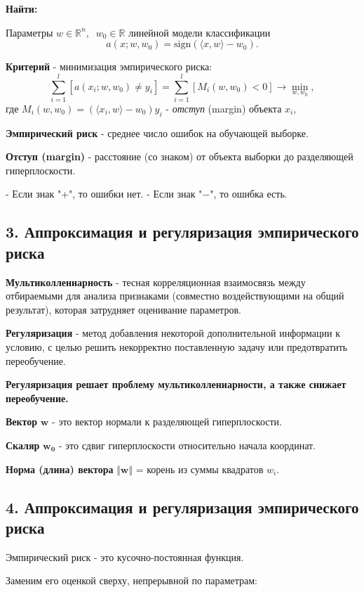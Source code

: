 \textbf{Найти:}

Параметры $w \in \mathbb{R}^n, \;\; w_0 \in \mathbb{R}$ линейной модели классификации
$$a{(x; w, w_0)} = \text{sign}{\left( {\langle x, w \rangle} - w_0 \right)}.$$

\textbf{Критерий} - минимизация эмпирического риска:
$$\sum_{i=1}^{l}{\left[ a{(x_i; w, w_0)} \neq y_i \right]} = \sum_{i=1}^{l}{\left[ M_i{(w, w_0)} < 0 \right]} \rightarrow \min_{w, w_0},$$
где $M_i{(w, w_0)} = {\left( {\langle x_i, w \rangle} - w_0 \right)} y_i$ -
\textit{отступ} (margin) объекта $x_i$,

\textbf{Эмпирический риск} - среднее число ошибок на обучающей выборке.

\textbf{Отступ (margin)} - расстояние (со знаком) от объекта выборки до
разделяющей гиперплоскости.

- Если знак "+", то ошибки нет.
- Если знак "$-$", то ошибка есть.

\subsection{3. Аппроксимация и регуляризация эмпирического риска}

\textbf{Мультиколлениарность} - тесная корреляционная взаимосвязь между
отбираемыми для анализа признаками (совместно воздействующими на общий
результат), которая затрудняет оценивание параметров.

\textbf{Регуляризация} - метод добавления некоторой дополнительной информации к
условию, с целью решить некорректно поставленную задачу или предотвратить
переобучение.

\textbf{Регуляризация решает проблему мультиколлениарности, а также снижает
переобучение.}

\textbf{Вектор} $\mathbf{w}$ - это вектор нормали к разделяющей гиперплоскости.

\textbf{Скаляр} $\mathbf{w_0}$ - это сдвиг гиперплоскости относительно начала
координат.

\textbf{Норма (длина) вектора} $\mathbf{\Vert w \Vert}$ = корень из суммы
квадратов $w_i$.

\subsection{4. Аппроксимация и регуляризация эмпирического риска}

Эмпирический риск - это кусочно-постоянная функция.

Заменим его оценкой сверху, непрерывной по параметрам:

